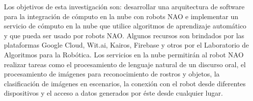 
Los objetivos de esta investigación son: desarrollar una 
arquitectura de software para  la  
integración  de  cómputo  en  la  nube  con  robots  NAO
e implementar un  servicio  de  cómputo  en  la  nube  que  utilice  
algoritmos  de  aprendizaje  automático y que pueda
ser usado por robots NAO.
Algunos recursos son brindados por las plataformas
Google Cloud, Wit.ai, Kairos, Firebase y otros
por el Laboratorio de Algoritmos para la
Robótica.
Los servicios en la nube permitirán al robot NAO
realizar tareas como el procesamiento de lenguaje
natural de un discurso oral, el procesamiento 
de imágenes para reconocimiento de rostros
y objetos, la clasificación de
imágenes en escenarios, la conexión con el robot desde diferentes dispositivos y el acceso a datos generados por
éste desde cualquier lugar.

